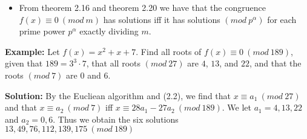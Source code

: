 \documentclass[a4paper]{article}
\begin{document}
\begin{itemize}
    \item From theorem 2.16 and theorem 2.20 we have that the congruence
    $f(x)\equiv 0\ (mod\ m)$ has solutions iff it has solutions $(mod\ p^\alpha)$
    for each prime power $p^\alpha$ exactly dividing $m$.
\end{itemize}

\textbf{Example:}
Let $f(x)=x^2+x+7$. Find all roots of $f(x)\equiv 0\ (mod\ 189)$, given that
$189=3^3\cdot7$, that all roots $(mod\ 27)$ are $4$, $13$, and $22$, and that
the roots $(mod\ 7)$ are $0$ and $6$.

\textbf{Solution:}
By the Eucliean algorithm and (2.2), we find that $x\equiv a_1\ (mod\ 27)$ and that
$x\equiv a_2\ (mod\ 7)$ iff $x\equiv 28a_1-27a_2\ (mod\ 189)$. We let $a_1=4, 13, 22$
and $a_2=0, 6$. Thus we obtain the six solutions $13, 49, 76, 112, 139, 175\ (mod\ 189)$
\end{document}
